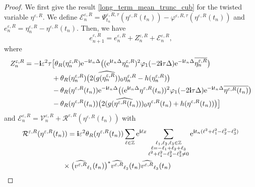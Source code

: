 \documentclass[a4paper]{amsart}
\begin{document}
\begin{proof}
    We first give the result \eqref{long_term_mean_trunc_cub} for the twisted variable $\eta^{\varepsilon,R}$. We define $\mathcal{E}^{\varepsilon,R}_n=\Psi_{t_n}^{\varepsilon,R,\tau} (\eta^{\varepsilon,R}(t_n))-\varphi^{\varepsilon,R,\tau}(\eta^{\varepsilon,R}(t_n))$ and $e^{\varepsilon,R}_n=\eta^{\varepsilon,R}_n-\eta^{\varepsilon,R}(t_n)$. Then, we have
    $$
    e^{\varepsilon,R}_{n+1}=e^{\varepsilon,R}_n+Z^{\varepsilon,R}_n+\mathcal{E}^{\varepsilon,R}_n,
    $$
    where 
    \begin{align*}
        Z^{\varepsilon,R}_n=-{\bf i}\varepsilon^2 \tau & \big[\theta_R(\eta^{\varepsilon,R}_n){\rm e}^{-{\bf i}t_n\Delta}\big(({\rm e}^{{\bf i}t_n\Delta}\eta^{\varepsilon,R}_n)^2 \varphi_1(-2{\bf i}\tau\Delta){\rm e}^{-{\bf i}t_n\Delta}\overline{\eta^{\varepsilon,R}_n}\big) \\
        &+\theta_R(\eta^{\varepsilon,R}_n)\big(2(\widehat{g(\eta^{\varepsilon,R}_n)})_0 \eta^{\varepsilon,R}_n-h(\eta^{\varepsilon,R}_n)\big)\\
        & - \theta_R(\eta^{\varepsilon,R}(t_n)){\rm e}^{-{\bf i}t_n\Delta}\big(({\rm e}^{{\bf i}t_n\Delta}\eta^{\varepsilon,R}(t_n))^2 \varphi_1(-2{\bf i}\tau\Delta){\rm e}^{-{\bf i}t_n\Delta}\overline{\eta^{\varepsilon,R}(t_n)}\big) \\
        &-\theta_R(\eta^{\varepsilon,R}(t_n))\big(2(\widehat{g(\eta^{\varepsilon,R}(t_n))})_0 \eta^{\varepsilon,R}(t_n)+h(\eta^{\varepsilon,R}(t_n))\big)\big]
    \end{align*}
    and $\mathcal{E}^{\varepsilon,R}_{n}=\mathcal{V}^{\varepsilon,R}_n+\mathcal{R}^{\varepsilon,R}(\eta^{\varepsilon,R}(t_n))$ with
    \begin{align*}
        &\mathcal{R}^{\varepsilon,R}(\eta^{\varepsilon,R}(t_n))={\bf i}\varepsilon^2\theta_R(\eta^{\varepsilon,R}(t_n)) \displaystyle\sum_{\ell \in\mathbb{Z}}{\rm e}^{{\bf i}\ell x}\displaystyle\sum_{\substack{\ell_1,\ell_2,\ell_3 \in\mathbb{Z} \\ \ell=-\ell_1+\ell_2+\ell_3\\ \ell^2+\ell_1^2-\ell_2^2-\ell_3^2\ne 0}}{\rm e}^{{\bf i}t_n (\ell^2+\ell_1^2-\ell_2^2-\ell_3^2)}\\ 
        &\hspace{2cm}\times \big(\widehat{v^{\varepsilon,R}}_{\ell_1}(t_n)\big)^*\widehat{v^{\varepsilon,R}}_{\ell_2}(t_n)\widehat{v^{\varepsilon,R}}_{\ell_3}(t_n)

\end{align*}
\end{proof}
\end{document}

